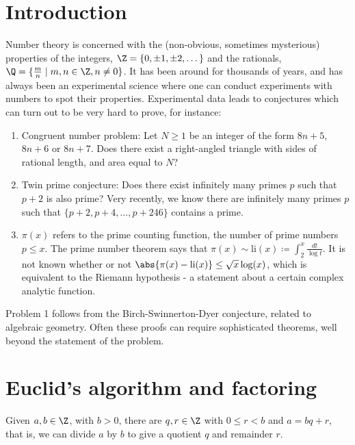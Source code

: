 \documentclass{article}
\begin{document}
\maketitle
\tableofcontents

\section{Introduction}
Number theory is concerned with the (non-obvious, sometimes mysterious) properties of the integers, $\Z = \{0, \pm 1, \pm 2, \dots\}$ and the rationals, $\Q = \{\frac{m}{n} \mid m, n \in \Z, n \ne 0\}$.
It has been around for thousands of years, and has always been an experimental science where one can conduct experiments with numbers to spot their properties. Experimental data leads to conjectures which can turn out to be very hard to prove, for instance:
\begin{enumerate}
    \item Congruent number problem: Let $N \geq 1$ be an integer of the form $8n + 5$, $8n+6$ or $8n + 7$.
        Does there exist a right-angled triangle with sides of rational length, and area equal to $N$?
    \item Twin prime conjecture: Does there exist infinitely many primes $p$ such that $p+2$ is also prime?
        Very recently, we know there are infinitely many primes $p$ such that $\{p+2, p+4, \dots, p+246\}$ contains a prime.
    \item $\pi(x)$ refers to the prime counting function, the number of prime numbers $p \leq x$.
        The prime number theorem says that $\pi(x) \sim \mathrm{li}(x) \coloneqq \int_2^x \frac{dt}{\log t}$.
        It is not known whether or not $\abs{\pi(x) - \mathrm{li}(x)} \leq \sqrt{x} \log(x)$, which is equivalent to the Riemann hypothesis - a statement about a certain complex analytic function.
\end{enumerate}
Problem 1 follows from the Birch-Swinnerton-Dyer conjecture, related to algebraic geometry.
Often these proofs can require sophisticated theorems, well beyond the statement of the problem.
\clearpage

\section{Euclid's algorithm and factoring}
\begin{defi}
    Given $a, b \in \Z$, with $b > 0$, there are $q, r \in \Z$ with $0 \leq r < b$ and $a = b q + r$, that is, we can divide $a$ by $b$ to give a quotient $q$ and remainder $r$.
\end{defi}
\end{document}
